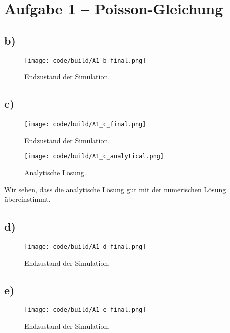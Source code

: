 \section{Aufgabe 1 – Poisson-Gleichung}
\label{sec:A1}

\FloatBarrier
\subsection{b)}
\begin{figure}
    \centering
    \texttt{[image: code/build/A1\_b\_final.png]}
    \caption{Endzustand der Simulation.}
    \label{fig:b_final}
\end{figure}

\FloatBarrier
\subsection{c)}
\begin{figure}
    \centering
    \texttt{[image: code/build/A1\_c\_final.png]}
    \caption{Endzustand der Simulation.}
    \label{fig:c_final}
\end{figure}

\begin{figure}
    \centering
    \texttt{[image: code/build/A1\_c\_analytical.png]}
    \caption{Analytische Lösung.}
    \label{fig:c_final}
\end{figure}

Wir sehen, dass die analytische Lösung gut mit der numerischen Lösung übereinstimmt.

\FloatBarrier
\subsection{d)}
\begin{figure}
    \centering
    \texttt{[image: code/build/A1\_d\_final.png]}
    \caption{Endzustand der Simulation.}
    \label{fig:d_final}
\end{figure}

\FloatBarrier
\subsection{e)}
\begin{figure}
    \centering
    \texttt{[image: code/build/A1\_e\_final.png]}
    \caption{Endzustand der Simulation.}
    \label{fig:e_final}
\end{figure}
